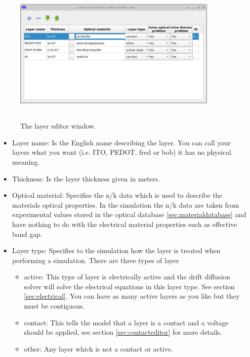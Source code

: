 \begin{figure}[H]
\centering
\includegraphics[width=100mm,height=70mm]{./images/layer_editor.png}
\caption{The layer editor window.}
\label{fig:jv_curve}
\end{figure}

\begin{itemize}
  \item Layer name: Is the English name describing the layer. You can call your layers what you want (i.e. ITO, PEDOT, fred or bob) it has no physical meaning.
  \item Thickness: Is the layer thickness given in meters.
  \item Optical material: Specifies the n/k data which is used to describe the materials optical properties. In the simulation the n/k data are taken from experimental values stored in the optical database \ref{sec:materialdatabase} and have nothing to do with the electrical material properties such as effective band gap.
  \item Layer type: Specifies to the simulation how the layer is treated when performing a simulation. There are three types of layer
	\begin{itemize}
	  \item active: This type of layer is electrically active and the drift diffusion solver will solve the electrical equations in this layer type. See section \ref{sec:electrical}. You can have as many active layers as you like but they must be contiguous.
 	  \item contact: This tells the model that a layer is a contact and a voltage should be applied, see section \ref{sec:contacteditor} for more details.
 	  \item other: Any layer which is not a contact or active.

	\end{itemize}
\end{itemize}

